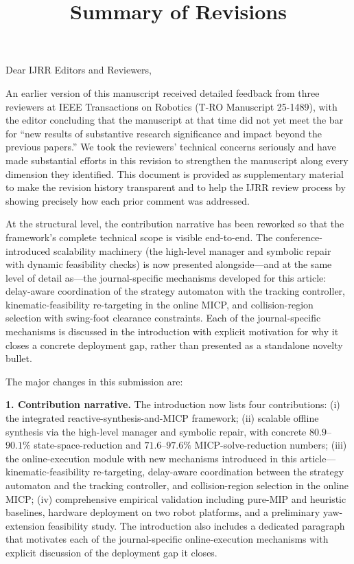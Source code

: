 \title{Summary of Revisions}
\vskip 0.2in

\noindent Dear IJRR Editors and Reviewers,
\vskip 0.1in

\noindent An earlier version of this manuscript received detailed feedback from three reviewers at IEEE Transactions on Robotics (T-RO Manuscript 25-1489), with the editor concluding that the manuscript at that time did not yet meet the bar for ``new results of substantive research significance and impact beyond the previous papers.'' We took the reviewers' technical concerns seriously and have made substantial efforts in this revision to strengthen the manuscript along every dimension they identified. This document is provided as supplementary material to make the revision history transparent and to help the IJRR review process by showing precisely how each prior comment was addressed.

\vskip 0.1in

\noindent At the structural level, the contribution narrative has been reworked so that the framework's complete technical scope is visible end-to-end. The conference-introduced scalability machinery (the high-level manager and symbolic repair with dynamic feasibility checks) is now presented alongside---and at the same level of detail as---the journal-specific mechanisms developed for this article: delay-aware coordination of the strategy automaton with the tracking controller, kinematic-feasibility re-targeting in the online MICP, and collision-region selection with swing-foot clearance constraints. Each of the journal-specific mechanisms is discussed in the introduction with explicit motivation for why it closes a concrete deployment gap, rather than presented as a standalone novelty bullet.

\vskip 0.1in

\noindent The major changes in this submission are:

\noindent \textbf{1. Contribution narrative.} The introduction now lists four contributions: (i) the integrated reactive-synthesis-and-MICP framework; (ii) scalable offline synthesis via the high-level manager and symbolic repair, with concrete $80.9$--$90.1\%$ state-space-reduction and $71.6$--$97.6\%$ MICP-solve-reduction numbers; (iii) the online-execution module with new mechanisms introduced in this article---kinematic-feasibility re-targeting, delay-aware coordination between the strategy automaton and the tracking controller, and collision-region selection in the online MICP; (iv) comprehensive empirical validation including pure-MIP and heuristic baselines, hardware deployment on two robot platforms, and a preliminary yaw-extension feasibility study. The introduction also includes a dedicated paragraph that motivates each of the journal-specific online-execution mechanisms with explicit discussion of the deployment gap it closes.

